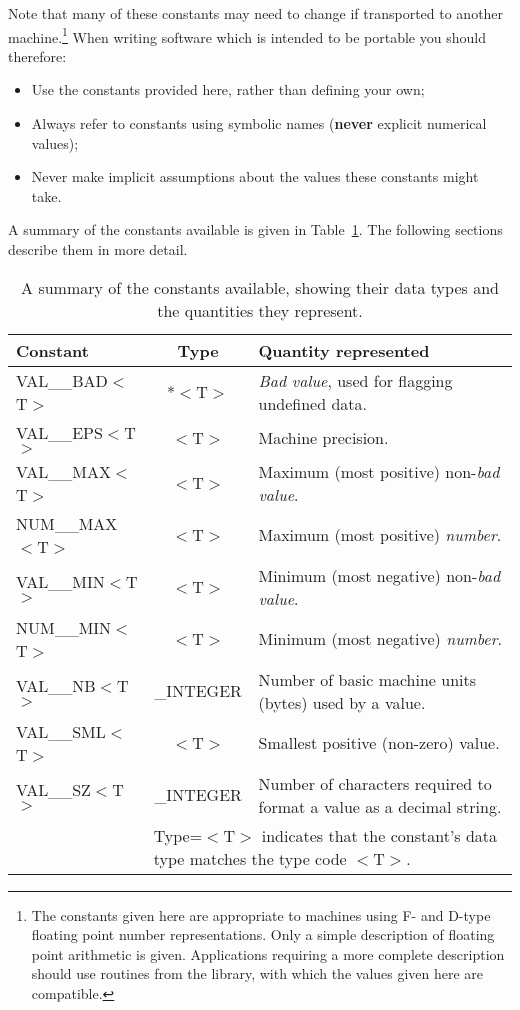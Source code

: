 Note that many of these constants may need to change if transported to
another machine.\footnote{
The constants given here are appropriate to  machines using F- and
D-type floating point number representations. 
Only a simple description of floating point arithmetic is given.
Applications requiring a more complete description should use routines
from the  library, with which the values given here are compatible.}
When writing software which is intended to be portable you should therefore:

\begin{itemize}

\item Use the constants provided here, rather than defining your own;

\item Always refer to constants using symbolic names ({\bf never} explicit
numerical values);

\item Never make implicit assumptions about the values these constants might
take. 

\end{itemize}

A summary of the constants available is given in
Table~\ref{table:constants}.
The following sections describe them in more detail.

\begin{table}
\begin{center}
\begin{tabular}{|l|c|p{25em}|}
\hline
{\bf Constant} & {\bf Type} & {\bf Quantity represented} \\
\hline
VAL\_\_BAD$<$T$>$ & *$<$T$>$ & {\em Bad value}, used for flagging undefined
data. 
\\
VAL\_\_EPS$<$T$>$ & $<$T$>$ & Machine precision.
\\
VAL\_\_MAX$<$T$>$ & $<$T$>$ & Maximum (most positive) non-{\em bad value}. 
\\
NUM\_\_MAX$<$T$>$ & $<$T$>$ & Maximum (most positive) {\em number}.
\\
VAL\_\_MIN$<$T$>$ & $<$T$>$ & Minimum (most negative) non-{\em bad value}. 
\\
NUM\_\_MIN$<$T$>$ & $<$T$>$ & Minimum (most negative) {\em number}.
\\
VAL\_\_NB$<$T$>$ & \_INTEGER & Number of basic machine units (bytes) used
by a value.
\\
VAL\_\_SML$<$T$>$ & $<$T$>$ & Smallest positive (non-zero) value.
\\
VAL\_\_SZ$<$T$>$ & \_INTEGER & Number of characters required to format a 
value as a decimal string. 
\\
\hline
\multicolumn{1}{|c}{} &
\multicolumn{2}{l|}{\footnotesize *Type=$<$T$>$ indicates that the 
constant's data type matches the type code $<$T$>$.} \\
\hline
\end{tabular}
\caption{A summary of the constants available, showing their data types and
the quantities they represent.} 
\label{table:constants}
\end{center}
\end{table}

